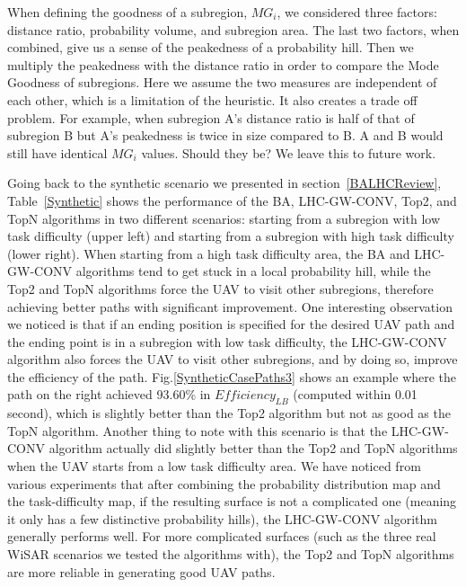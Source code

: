 \documentclass[journal]{IEEEtran}
\begin{document}
When defining the goodness of a subregion, $MG_i$, we considered three factors: distance ratio, probability volume, and subregion area. The last two factors, when combined, give us a sense of the peakedness of a probability hill. Then we multiply the peakedness with the distance ratio in order to compare the Mode Goodness of subregions. Here we assume the two measures are independent of each other, which is a limitation of the heuristic. It also creates a trade off problem. For example, when subregion A's distance ratio is half of that of subregion B but A's peakedness is twice in size compared to B. A and B would still have identical $MG_i$ values. Should they be? We leave this to future work.

Going back to the synthetic scenario we presented in section~\ref{BALHCReview}, Table~\ref{Synthetic} shows the performance of the BA, LHC-GW-CONV, Top2, and TopN algorithms in two different scenarios: starting from a subregion with low task difficulty (upper left) and starting from a subregion with high task difficulty (lower right). When starting from a high task difficulty area, the BA and LHC-GW-CONV algorithms tend to get stuck in a local probability hill, while the Top2 and TopN algorithms force the UAV to visit other subregions, therefore achieving better paths with significant improvement. One interesting observation we noticed is that if an ending position is specified for the desired UAV path and the ending point is in a subregion with low task difficulty, the LHC-GW-CONV algorithm also forces the UAV to visit other subregions, and by doing so, improve the efficiency of the path. Fig.\ref{SyntheticCasePaths3} shows an example where the path on the right achieved 93.60\% in $\mathit{Efficiency_{LB}}$ (computed within 0.01 second), which is slightly better than the Top2 algorithm but not as good as the TopN algorithm. Another thing to note with this scenario is that the LHC-GW-CONV algorithm actually did slightly better than the Top2 and TopN algorithms when the UAV starts from a low task difficulty area. We have noticed from various experiments that after combining the probability distribution map and the task-difficulty map, if the resulting surface is not a complicated one (meaning it only has a few distinctive probability hills), the LHC-GW-CONV algorithm generally performs well. For more complicated surfaces (such as the three real WiSAR scenarios we tested the algorithms with), the Top2 and TopN algorithms are more reliable in generating good UAV paths. 

\end{document}
